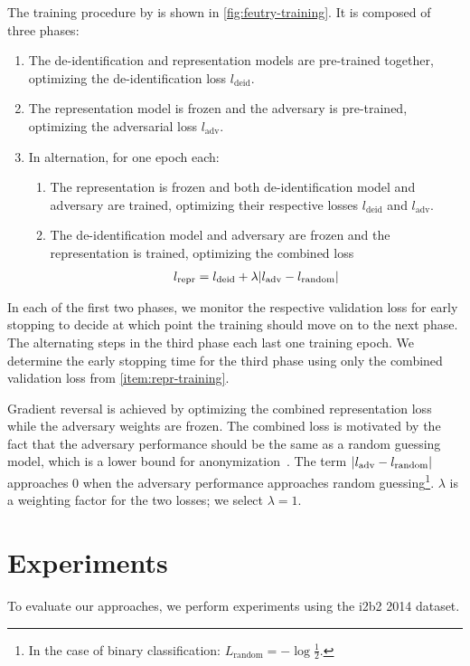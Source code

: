 %
The training procedure by \citet{feutry2018learning} is shown in \cref{fig:feutry-training}.
%
It is composed of three phases:
%
\begin{enumerate}[label=P\arabic*.,ref=P\arabic*]
    \item The de-identification and representation models are pre-trained together, optimizing the de-identification loss $l_{\text{deid}}$.
    \item The representation model is frozen and the adversary is pre-trained, optimizing the adversarial loss $l_{\text{adv}}$.
    \item In alternation, for one epoch each:
    \begin{enumerate}
        \item The representation is frozen and both de-identification model and adversary are trained, optimizing their respective losses $l_{\text{deid}}$ and $l_{\text{adv}}$.
        \item The de-identification model and adversary are frozen and the representation is trained, optimizing the combined loss
        \begin{align}
            l_{\text{repr}} = l_{\text{deid}} + \lambda \lvert l_{\text{adv}} - l_{\text{random}}\rvert
        \end{align}
        \label{item:repr-training}
    \end{enumerate}
\end{enumerate}
%
In each of the first two phases, we monitor the respective validation loss for early stopping to decide at which point the training should move on to the next phase.
%
The alternating steps in the third phase each last one training epoch.
%
We determine the early stopping time for the third phase using only the combined validation loss from \ref{item:repr-training}.

%
Gradient reversal is achieved by optimizing the combined representation loss while the adversary weights are frozen.
%
The combined loss is motivated by the fact that the adversary performance should be the same as a random guessing model, which is a lower bound for anonymization~\citep{feutry2018learning}.
%
The term $\lvert l_{\text{adv}} - l_{\text{random}}\rvert$ approaches $0$ when the adversary performance approaches random guessing\footnote{In the case of binary classification: $L_{\text{random}} = -\log \frac{1}{2}$.}.
%
$\lambda$ is a weighting factor for the two losses; we select $\lambda=1$.

\section{Experiments}
%
To evaluate our approaches, we perform experiments using the i2b2 2014 dataset.

